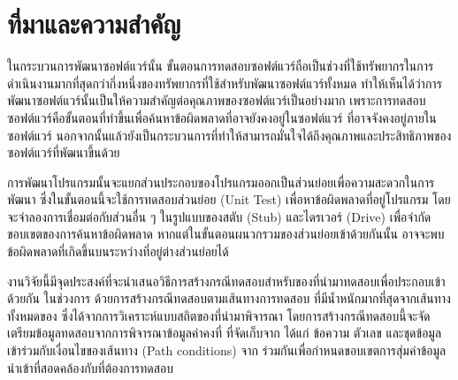 \section{ที่มาและความสำคัญ} 

ในกระบวนการพัฒนาซอฟต์แวร์นั้น ขั้นตอนการทดสอบซอฟต์แวร์ถือเป็นช่วงที่ใช้ทรัพยากรในการดำเนินงานมากที่สุดกว่ากึ่งหนึ่งของทรัพยากรที่ใช้สำหรับพัฒนาซอฟต์แวร์ทั้งหมด 
ทำให้เห็นได้ว่าการพัฒนาซอฟต์แวร์นั้นเป็นให้ความสำคัญต่อคุณภาพของซอฟต์แวร์เป็นอย่างมาก 
เพราะการทดสอบซอฟต์แวร์คือขั้นตอนที่ทำขึ้นเพื่อค้นหาข้อผิดพลาดที่อาจยังคงอยู่ในซอฟต์แวร์ ที่อาจจังคงอยู่ภายในซอฟต์แวร์ \cite{Myers:2011:AST:983238} 
นอกจากนั้นแล้วยังเป็นกระบวนการที่ทำให้สามารถมั่นใจได้ถึงคุณภาพและประสิทธิภาพของซอฟต์แวร์ที่พัฒนาขึ้นด้วย




การพัฒนาโปรแกรมนั้นจะแยกส่วนประกอบของโปรแกรมออกเป็นส่วนย่อยเพื่อความสะดวกในการพัฒนา ซึ่งในขั้นตอนนี้จะใช้การทดสอบส่วนย่อย (Unit Test) 
เพื่อหาข้อผิดพลาดที่อยู่โปรแกรม โดยจะจำลองการเชื่อมต่อกับส่วนอื่น ๆ ในรูปแบบของสตับ (Stub) และไดรเวอร์ (Drive) เพื่อจำกัดขอบเขตของการค้นหาข้อผิดพลาด
หากแต่ในขั้นตอนผนวกรวม{\sourcecode}ของส่วนย่อยเข้าด้วยกันนั้น อาจจะพบข้อผิดพลาดที่เกิดขึ้นบน{\Path}ระหว่าง{\class}ที่อยู่ต่างส่วนย่อยได้

งานวิจัยนี้มีจุดประสงค์ที่จะนำเสนอวิธีการสร้างกรณีทดสอบสำหรับ{\sourcecode}ของ{\softwareComponent}ที่นำมาทดสอบเพื่อประกอบเข้าด้วยกัน
ในช่วงการ\FirstTimeDefine{\IntegrationTesting}{\IntegrationTestingEN} ด้วยการสร้างกรณีทดสอบตามเส้นทางการทดสอบ
ที่มีน้ำหนักมากที่สุดจากเส้นทางทั้งหมดของ{\scg} ซึ่งได้จากการวิเคราะห์แบบสถิตของ{\sourcecode}ที่นำมาพิจารณา 
โดยการสร้างกรณีทดสอบนี้จะจัดเตรียมข้อมูลทดสอบจากการพิจารณาข้อมูลค่าคงที่ ที่จัดเก็บจาก{\sourcecode} ได้แก่ ข้อความ ตัวเลข และชุดข้อมูล 
เข้าร่วมกับเงื่อนไขของเส้นทาง (Path conditions) จาก{\cfg} 
ร่วมกันเพื่อกำหนดขอบเขตการสุ่มค่าข้อมูลนำเข้าที่สอดคล้องกับ\FirstTimeDefine{\MethodSignature}{\MethodSignatureEN}ที่ต้องการทดสอบ

